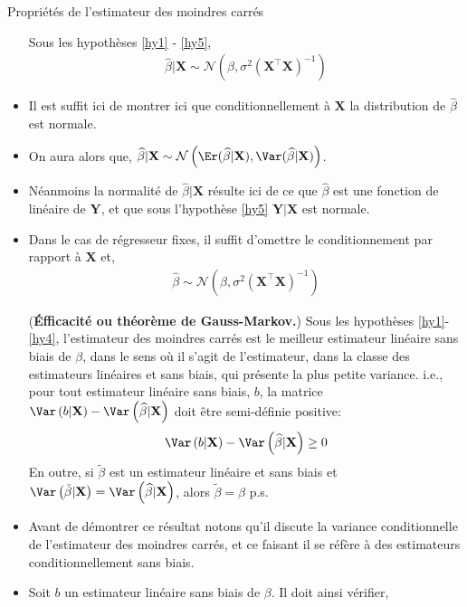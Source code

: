 \begin{frame}[allowframebreaks]{Propriétés de l'estimateur des moindres carrés}
\begin{itemize}
\begin{proposition}
Sous les hypothèses \ref{hy1} - \ref{hy5},
\begin{align*}
\widehat{\beta} | \mathbf{X} \sim \mathcal{N}\left(\beta, \sigma^2(\mathbf{X}^\top\mathbf{X})^{-1}\right)
\end{align*}
\end{proposition}
\item  Il est suffit ici de montrer ici que conditionnellement à $\mathbf{X}$ la distribution de $\widehat{\beta}$ est normale.
\item  On aura alors que, $\widehat{\beta} | \mathbf{X}\sim \mathcal{N}\left(\Er(\widehat{\beta}| \mathbf{X}), \Var(\widehat{\beta} | \mathbf{X})\right)$. 
\item Néanmoins la normalité de $\widehat{\beta} | \mathbf{X}$ résulte ici de ce que $\widehat{\beta}$ est une fonction de linéaire de $\mathbf{Y}$, et que sous l'hypothèse \ref{hy5} $\mathbf{Y}|\mathbf{X}$ est normale.
\item Dans le cas de régresseur fixes, il suffit d'omettre le conditionnement par rapport à $\mathbf{X}$ et,
\begin{align*}
\widehat{\beta}\sim\mathcal{N}\left(\beta, \sigma^2(\mathbf{X}^\top\mathbf{X})^{-1}\right)
\end{align*}
\begin{proposition}(\textbf{\'Efficacité ou théorème de Gauss-Markov.}) Sous les hypothèses \ref{hy1}-\ref{hy4}, l'estimateur des moindres carrés est le meilleur estimateur linéaire sans biais de $\beta$, dans le sens où il s'agit de l'estimateur, dans la classe des estimateurs linéaires et sans biais, qui présente la plus petite variance. i.e., pour tout estimateur linéaire sans biais, $b$, la matrice $\Var\left(b|\mathbf{X}\right)-\Var\left(\widehat{\beta}|\mathbf{X}\right)$ doit être semi-définie positive:
\begin{align*}
\Var\left(b|\mathbf{X}\right)-\Var\left(\widehat{\beta}|\mathbf{X}\right) \geq 0
\end{align*}
En outre, si $\tilde{\beta}$ est un estimateur linéaire et sans biais et 
$\Var\left(\tilde{\beta}|\mathbf{X}\right) = \Var\left(\widehat{\beta}|\mathbf{X}\right)$, alors $\tilde{\beta} = \widehat{\beta}$ p.s.
\end{proposition}
\item Avant de démontrer ce résultat notons qu'il discute la variance conditionnelle de l'estimateur des moindres carrés, et ce faisant il se réfère à des estimateurs conditionnellement sans biais.
\item Soit $b$ un estimateur linéaire sans biais de $\beta$. Il doit ainsi vérifier,

\end{itemize}
\end{frame}
